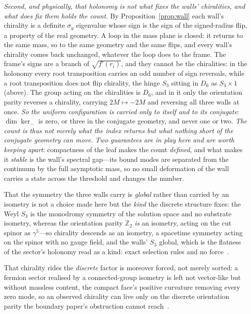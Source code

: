 \documentclass[11pt]{article}
\begin{document}
\emph{Second, and physically, that holonomy is not what fixes the walls' chiralities, and what does fix them
holds the count.} By Proposition~\ref{prop:wall} each wall's chirality is a definite $\sigma_{y}$ eigenvalue whose
sign is the sign of the signed-radius flip, a property of the real geometry. A loop in the mass plane is closed:
it returns to the same mass, so to the same geometry and the same flips, and every wall's chirality comes back
unchanged, whatever the loop does to the frame. The frame's signs are a branch of $\sqrt{f'(r_{i})}$, and they
cannot be the chiralities: in the holonomy every root transposition carries an odd number of sign reversals, while a root
transposition does not flip chirality, the hinge $S_{3}$ sitting in $D_{6}$ as $S_{3}\times1$ (above). The group
acting on the chiralities is $D_{6}$, and in it only the orientation parity reverses a chirality, carrying
$2M\mapsto-2M$ and reversing all three walls at once. \emph{So the uniform configuration is carried only to
itself and to its conjugate}: $\dim\ker_{-}$ is zero, or three in the conjugate geometry, and never one or
two. \emph{The count is thus not merely what the
index returns but what nothing short of the conjugate geometry can move.} \emph{Two guarantees are in play here and are worth keeping apart}: compactness of the leaf makes the
count \emph{defined}, and what makes it \emph{stable} is the wall's spectral gap---its bound modes are
separated from the continuum by the full asymptotic mass, so no small deformation of the wall carries a
state across the threshold and changes the number. 

That the symmetry the three walls carry is \emph{global} rather than carried by an isometry is not a choice made here but the \emph{kind} the discrete structure fixes: the Weyl $S_3$ is the
monodromy symmetry of the solution space and no substrate isometry, whereas the orientation parity $\mathbb{Z}_2$ \emph{is} an isometry, acting on the cut spinor as $\gamma^5$---so chirality descends as an isometry, a spacetime symmetry acting on the spinor with no gauge field, and the walls' $S_3$ global, which is the flatness of the sector's holonomy read as a kind: exact selection rules and no force~\cite{JanzenGroupoid,JanzenAlgebroid}. 

That chirality rides the \emph{discrete} factor is moreover forced, not merely sorted: a fermion sector realised by a connected-group isometry is left not vector-like but without massless content, the compact face's positive curvature removing every zero mode, so an observed chirality can live only on the discrete orientation parity the boundary paper's obstruction cannot reach~\cite{JanzenBoundary}. 
\end{document}
